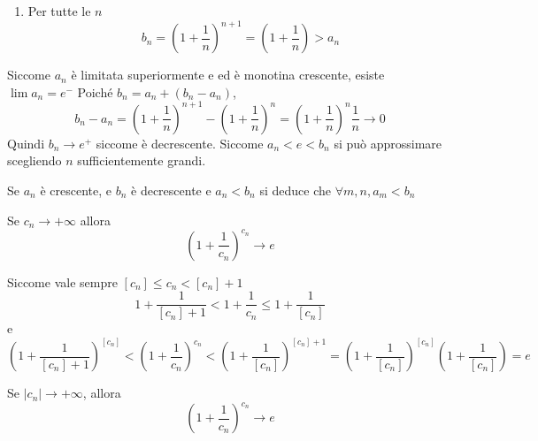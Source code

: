 \documentclass[a4paper]{article}
\begin{document}
\begin{snippetproof}{}
\begin{enumerate}
\begin{align*}
{            } \\
            &= \frac{
            1 + \frac{1}{n}
            }{
                {\left(1 + \frac{1}{n^2-1}\right)}^n
            }
        \end{align*}
        Usando la disuguaglianza di Bernoulli, per \(n \geq 2\)
        \[
            {\left(1 + \frac{1}{n^2-1}\right)}^n > 1 + n\left(\frac{1}{n^2-1}\right)
            > 1 + \frac{n}{n^2} = 1 + \frac{1}{n}
        \]
        \item Per tutte le \(n\)
        \[
            b_n = {\left(1 + \frac{1}{n}\right)}^{n+1}
            = {\left(1 + \frac{1}{n}\right)} > a_n
        \]
    \end{enumerate}
\end{snippetproof}

Siccome \(a_n\) è limitata superiormente e ed è monotina crescente,
esiste \(\lim a_n = e^-\)
Poiché \(b_n = a_n + (b_n - a_n)\),
\[
    b_n - a_n = {\left(1 + \frac{1}{n}\right)}^{n+1} - {\left(1 + \frac{1}{n}\right)}^n
    = {\left(1 + \frac{1}{n}\right)}^n \frac{1}{n} \to 0
\]
Quindi \(b_n \to e^+\) siccome è decrescente.
Siccome \(a_n < e < b_n\) si può approssimare scegliendo \(n\) sufficientemente grandi.

\begin{snippetproposition}{}
    Se \(a_n\) è crescente, e \(b_n\) è decrescente e \(a_n < b_n\) si deduce che
    \(\forall m,n, a_m < b_n\)
\end{snippetproposition}

\begin{snippetcorollary}{}
    Se \(c_n \to +\infty\) allora
    \[
        {\left(1 + \frac{1}{c_n}\right)}^{c_n} \to e
    \]
\end{snippetcorollary}

\begin{snippetproof}{}
    
    Siccome vale sempre \([c_n] \leq c_n < [c_n] + 1\)
    \[
        1 + \frac{1}{[c_n] + 1} <
        1 + \frac{1}{c_n} \leq
        1 + \frac{1}{[c_n]}
    \]
    e \[
        {\left(1 + \frac{1}{[c_n] + 1}\right)}^{[c_n]}
        < {\left(1 + \frac{1}{c_n}\right)}^{c_n} <
        {\left(1 + \frac{1}{[c_n]}\right)}^{[c_n] + 1}
        = {\left(1 + \frac{1}{[c_n]}\right)}^{[c_n]} {\left(1 + \frac{1}{[c_n]}\right)}
        = e
    \]
\end{snippetproof}

\begin{snippetproposition}{}
    Se \(|c_n| \to +\infty\), allora
    \[
        {\left(1 + \frac{1}{c_n}\right)}^{c_n} \to e
    \]
\end{snippetproposition}
\end{document}
